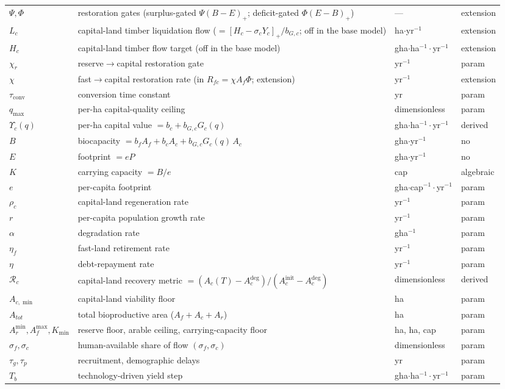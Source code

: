 \documentclass[11pt]{article}
\begin{document}
\begin{longtable}{>{\raggedright\arraybackslash}p{}>{\raggedright\arraybackslash}p{}>{\raggedright\arraybackslash}p{}>{\raggedright\arraybackslash}p{}}
$\Psi,\Phi$ & restoration gates (surplus-gated $\Psi(B-E)_+$; deficit-gated $\Phi(E-B)_+$) & --- & extension \\
$L_c$ & capital-land timber liquidation flow ($=[H_c-\sigma_cY_c]_+/b_{G,c}$; off in the base model) & ha$\cdot$yr$^{-1}$ & extension \\
$H_c$ & capital-land timber flow target (off in the base model) & gha$\cdot$ha$^{-1}\cdot$yr$^{-1}$ & extension \\
$\chi_r$ & reserve$\to$capital restoration gate & yr$^{-1}$ & param \\
$\chi$ & fast$\to$capital restoration rate (in $R_{fc}=\chi A_f\Phi$; extension) & yr$^{-1}$ & extension \\
$\tau_{\mathrm{conv}}$ & conversion time constant & yr & param \\
$q_{\max}$ & per-ha capital-quality ceiling & dimensionless & param \\
$\Upsilon_c(q)$ & per-ha capital value $=b_c+b_{G,c}G_c(q)$ & gha$\cdot$ha$^{-1}\cdot$yr$^{-1}$ & derived \\
$B$ & biocapacity $=b_f A_f+b_c A_c+b_{G,c}G_c(q)\,A_c$ & gha$\cdot$yr$^{-1}$ & no \\
$E$ & footprint $=eP$ & gha$\cdot$yr$^{-1}$ & no \\
$K$ & carrying capacity $=B/e$ & cap & algebraic \\
$e$ & per-capita footprint & gha$\cdot$cap$^{-1}\cdot$yr$^{-1}$ & param \\
$\rho_c$ & capital-land regeneration rate & yr$^{-1}$ & param \\
$r$ & per-capita population growth rate & yr$^{-1}$ & param \\
$\alpha$ & degradation rate & gha$^{-1}$ & param \\
$\eta_f$ & fast-land retirement rate & yr$^{-1}$ & param \\
$\eta$ & debt-repayment rate & yr$^{-1}$ & param \\
$\mathcal{R}_c$ & capital-land recovery metric $=(A_c(T)-A_c^{\mathrm{deg}})/(A_c^{\mathrm{init}}-A_c^{\mathrm{deg}})$ & dimensionless & derived \\
$A_{c,\min}$ & capital-land viability floor & ha & param \\
$A_{tot}$ & total bioproductive area ($A_f+A_c+A_r$) & ha & param \\
$A_r^{\min}, A_f^{\max}, K_{\min}$ & reserve floor, arable ceiling, carrying-capacity floor & ha, ha, cap & param \\
$\sigma_f,\sigma_c$ & human-available share of flow $(\sigma_f,\sigma_c)$ & dimensionless & param \\
$\tau_g,\tau_p$ & recruitment, demographic delays & yr & param \\
$T_b$ & technology-driven yield step & gha$\cdot$ha$^{-1}\cdot$yr$^{-1}$ & param \\
\bottomrule
\end{longtable}
\end{document}
